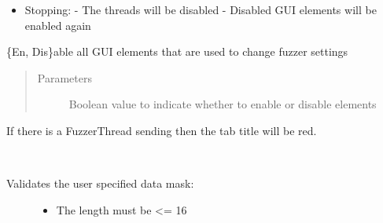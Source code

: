 \documentclass[letterpaper,10pt,english]{sphinxmanual}
\begin{document}
\begin{fulllineitems}
\begin{fulllineitems}
\begin{description}
\begin{itemize}
\item {} 
Stopping:
- The threads will be disabled
- Disabled GUI elements will be enabled again

\end{itemize}

\end{description}

\end{fulllineitems}


\begin{fulllineitems}
\label{\detokenize{src:src.FuzzerTab.FuzzerTab.toggleGUIElements}}
\{En, Dis\}able all GUI elements that are used to change fuzzer settings
\begin{quote}\begin{description}
\item[{Parameters}] \leavevmode
{} \textendash{} Boolean value to indicate whether to enable or disable elements

\end{description}\end{quote}

\end{fulllineitems}


\begin{fulllineitems}
\label{\detokenize{src:src.FuzzerTab.FuzzerTab.toggleLoopActive}}
If there is a FuzzerThread sending then the tab title will be red.

\end{fulllineitems}


\begin{fulllineitems}
\label{\detokenize{src:src.FuzzerTab.FuzzerTab.validateDataMaskInput}}~\begin{description}
\item[{Validates the user specified data mask:}] \leavevmode\begin{itemize}
\item {} 
The length must be \textless{}= 16


\end{itemize}
\end{description}
\end{fulllineitems}
\end{fulllineitems}
\end{document}

